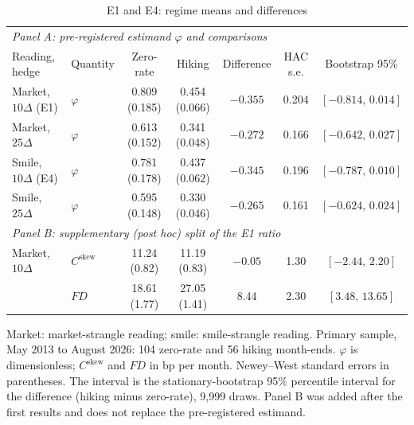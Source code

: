 \documentclass[11pt]{article}
\theoremstyle{result}
\newcommand{\FD}{\mathit{FD}}
\newcommand{\Cskew}{C^{\mathrm{skew}}}
\newcommand{\D}{\Delta}
\begin{document}
\begin{table}[t]
\centering\footnotesize
\setlength{\tabcolsep}{4pt}
\caption{E1 and E4: regime means and differences}\label{tab:e1}
\begin{tabular}{llccccc}
\toprule
\multicolumn{7}{l}{\emph{Panel A: pre-registered estimand $\varphi$ and comparisons}}\\
Reading, hedge & Quantity & Zero-rate & Hiking & Difference & HAC s.e. & Bootstrap 95\% \\
\midrule
Market, $10\D$ (E1) & $\varphi$ & 0.809 (0.185) & 0.454 (0.066) & $-0.355$ & 0.204 & $[-0.814,\,0.014]$ \\
Market, $25\D$ & $\varphi$ & 0.613 (0.152) & 0.341 (0.048) & $-0.272$ & 0.166 & $[-0.642,\,0.027]$ \\
Smile, $10\D$ (E4) & $\varphi$ & 0.781 (0.178) & 0.437 (0.062) & $-0.345$ & 0.196 & $[-0.787,\,0.010]$ \\
Smile, $25\D$ & $\varphi$ & 0.595 (0.148) & 0.330 (0.046) & $-0.265$ & 0.161 & $[-0.624,\,0.024]$ \\
\midrule
\multicolumn{7}{l}{\emph{Panel B: supplementary (post hoc) split of the E1 ratio}}\\
Market, $10\D$ & $\Cskew$ & 11.24 (0.82) & 11.19 (0.83) & $-0.05$ & 1.30 & $[-2.44,\,2.20]$ \\
 & $\FD$ & 18.61 (1.77) & 27.05 (1.41) & 8.44 & 2.30 & $[3.48,\,13.65]$ \\
\bottomrule
\end{tabular}
\par\medskip
\begin{minipage}{0.97\linewidth}\footnotesize
Market: market-strangle reading; smile: smile-strangle reading. Primary sample, May 2013 to August 2026: 104 zero-rate and 56 hiking month-ends. $\varphi$ is dimensionless; $\Cskew$ and $\FD$ in bp per month. Newey--West standard errors in parentheses. The interval is the stationary-bootstrap 95\% percentile interval for the difference (hiking minus zero-rate), 9,999 draws. Panel B was added after the first results and does not replace the pre-registered estimand.
\end{minipage}
\end{table}
\end{document}
